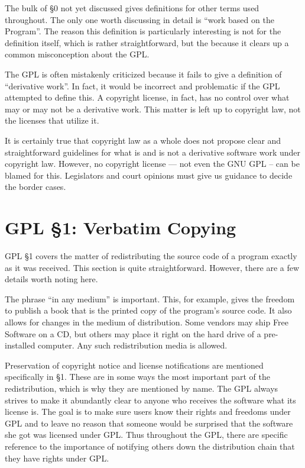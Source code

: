 \documentclass[12pt]{report}
\begin{document}
\medskip

The bulk of \S 0 not yet discussed gives definitions for other terms used
throughout.  The only one worth discussing in detail is ``work based on
the Program''.  The reason this definition is particularly interesting is
not for the definition itself, which is rather straightforward, but the
because it clears up a common misconception about the GPL\@.

The GPL is often mistakenly criticized because it fails to give a
definition of ``derivative work''.  In fact, it would be incorrect and
problematic if the GPL attempted to define this.  A copyright license, in
fact, has no control over what may or may not be a derivative work.  This
matter is left up to copyright law, not the licenses that utilize it.

It is certainly true that copyright law as a whole does not propose clear
and straightforward guidelines for what is and is not a derivative
software work under copyright law.  However, no copyright license --- not
even the GNU GPL -- can be blamed for this.  Legislators and court
opinions must give us guidance to decide the border cases.

\section{GPL \S 1: Verbatim Copying}
\label{GPLs1}

GPL \S 1 covers the matter of redistributing the source code of a program
exactly as it was received.  This section is quite straightforward.
However, there are a few details worth noting here.

The phrase ``in any medium'' is important.  This, for example, gives the
freedom to publish a book that is the printed copy of the program's source
code.  It also allows for changes in the medium of distribution.  Some
vendors may ship Free Software on a CD, but others may place it right on
the hard drive of a pre-installed computer.  Any such redistribution media
is allowed.

Preservation of copyright notice and license notifications are mentioned
specifically in \S 1.  These are in some ways the most important part of
the redistribution, which is why they are mentioned by name.  The GPL
always strives to make it abundantly clear to anyone who receives the
software what its license is.  The goal is to make sure users know their
rights and freedoms under GPL and to leave no reason that someone would be
surprised that the software she got was licensed under GPL\@.  Thus
throughout the GPL, there are specific reference to the importance of
notifying others down the distribution chain that they have rights under
GPL.
\end{document}
